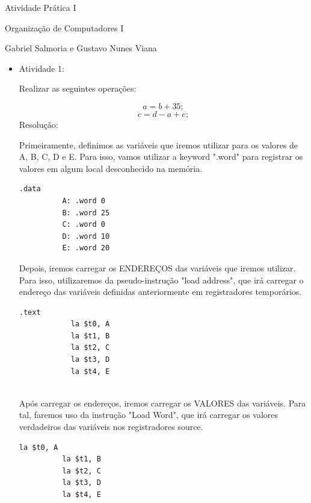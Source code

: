 \documentclass{report}
\begin{document}
\huge

\centerline {Atividade Prática I} 
\centerline {Organização de Computadores I} 

\large

\bigskip

\centerline {Gabriel Salmoria e Gustavo Nunes Viana} 

\begin{itemize}
    
  \bigskip
    \item Atividade 1: 
      
Realizar as seguintes operações:

\skip
$$ a = b + 35; $$ 
$$ c = d - a + e; $$ 
\bigskip
Resolução:

\bigskip

Primeiramente, definimos as variáveis que iremos utilizar
para os valores de A, B, C, D e E. Para isso, vamos utilizar
a keyword ".word" para registrar os valores em algum local 
desconhecido na memória.
\\

\normalsize

\begin{lstlisting}[language=Ant]
        .data
          A: .word 0
          B: .word 25
          C: .word 0
          D: .word 10
          E: .word 20
\end{lstlisting}
\large

Depois, iremos carregar os ENDEREÇOS das variáveis que
iremos utilizar. Para isso, utilizaremos da pseudo-instrução
"load address", que irá carregar o endereço das variáveis definidas
anteriormente em registradores temporários.


\normalsize
\bigskip

\begin{lstlisting}[language=Ant]
          .text
            la $t0, A
            la $t1, B
            la $t2, C
            la $t3, D
            la $t4, E
            
\end{lstlisting}

\large

Após carregar os endereços, iremos carregar os VALORES das
variáveis. Para tal, faremos uso da instrução "Load Word", que
irá carregar os valores verdadeiros das variáveis nos registradores
source.

\normalsize
\bigskip

\begin{lstlisting}[language=Ant]
          la $t0, A
          la $t1, B
          la $t2, C
          la $t3, D
          la $t4, E
          

\end{lstlisting}
\end{itemize}
\end{document}
